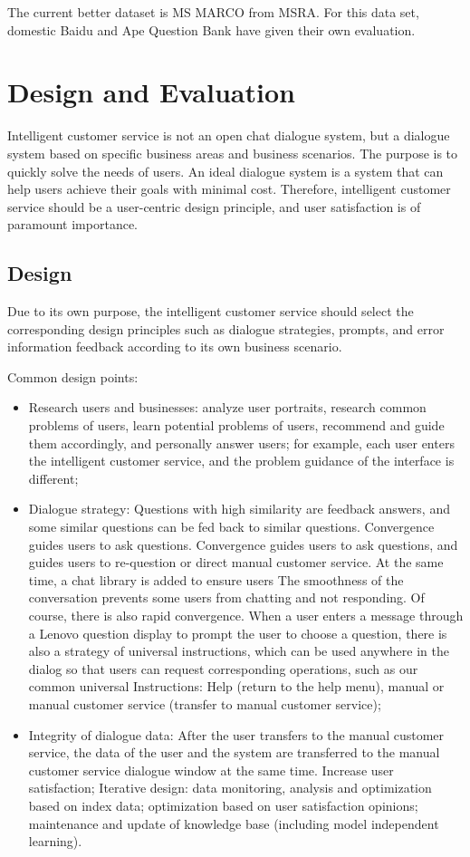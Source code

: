 \documentclass[11pt,en,number]{elegantpaper}
\begin{document}
	The current better dataset is MS MARCO from MSRA. For this data set, domestic Baidu and Ape Question Bank have given their own evaluation.
	\section{Design and Evaluation}
		Intelligent customer service is not an open chat dialogue system, but a dialogue system based on specific business areas and business scenarios. The purpose is to quickly solve the needs of users. An ideal dialogue system is a system that can help users achieve their goals with minimal cost\cite{12}. Therefore, intelligent customer service should be a user-centric design principle, and user satisfaction is of paramount importance.
		\subsection{Design}
		Due to its own purpose, the intelligent customer service should select the corresponding design principles such as dialogue strategies, prompts, and error information feedback according to its own business scenario.
		
		Common design points\cite{13}:
		\begin{itemize}
		\item Research users and businesses: analyze user portraits, research common problems of users, learn potential problems of users, recommend and guide them accordingly, and personally answer users; for example, each user enters the intelligent customer service, and the problem guidance of the interface is different;
		
		\item Dialogue strategy: Questions with high similarity are feedback answers, and some similar questions can be fed back to similar questions. Convergence guides users to ask questions. Convergence guides users to ask questions, and guides users to re-question or direct manual customer service. At the same time, a chat library is added to ensure users The smoothness of the conversation prevents some users from chatting and not responding. Of course, there is also rapid convergence. When a user enters a message through a Lenovo question display to prompt the user to choose a question, there is also a strategy of universal instructions, which can be used anywhere in the dialog so that users can request corresponding operations, such as our common universal Instructions: Help (return to the help menu), manual or manual customer service (transfer to manual customer service);
		
		\item Integrity of dialogue data: After the user transfers to the manual customer service, the data of the user and the system are transferred to the manual customer service dialogue window at the same time. Increase user satisfaction;
		Iterative design: data monitoring, analysis and optimization based on index data; optimization based on user satisfaction opinions; maintenance and update of knowledge base (including model independent learning).
		\end{itemize}
\end{document}
